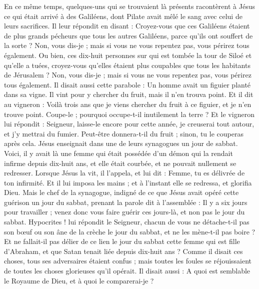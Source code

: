 \begin{multicols}{2}
{
\VerseOne{}En ce même temps, quelques-uns qui se trouvaient là présents racontèrent à Jésus ce qui était arrivé à des Galiléens, dont Pilate avait mêlé le sang avec celui de leurs sacrifices.
Il leur répondit en disant : Croyez-vous que ces Galiléens étaient de plus grands pécheurs que tous les autres Galiléens, parce qu'ils ont souffert de la sorte ?
Non, vous dis-je ; mais si vous ne vous repentez pas, vous périrez tous également.
Ou bien, ces dix-huit personnes sur qui est tombée la tour de Siloé et qu’elle a tuées, croyez-vous qu’elles étaient plus coupables que tous les habitants de Jérusalem ?
Non, vous dis-je ; mais si vous ne vous repentez pas, vous périrez tous également.
Il disait aussi cette parabole : Un homme avait un figuier planté dans sa vigne. Il vint pour y chercher du fruit, mais il n’en trouva point.
Et il dit au vigneron : Voilà trois ans que je viens chercher du fruit à ce figuier, et je n’en trouve point. Coupe-le ; pourquoi occupe-t-il inutilement la terre ?
Et le vigneron lui répondit : Seigneur, laisse-le encore pour cette année, je creuserai tout autour, et j’y mettrai du fumier.
Peut-être donnera-t-il du fruit ; sinon, tu le couperas après cela.
Jésus enseignait dans une de leurs synagogues un jour de sabbat.
Voici, il y avait là une femme qui était possédée d'un démon qui la rendait infirme depuis dix-huit ans, et elle était courbée, et ne pouvait nullement se redresser.
Lorsque Jésus la vit, il l'appela, et lui dit : Femme, tu es délivrée de ton infirmité.
Et il lui imposa les mains ; et à l’instant elle se redressa, et glorifia Dieu.
Mais le chef de la synagogue, indigné de ce que Jésus avait opéré cette guérison un jour du sabbat, prenant la parole dit à l'assemblée : Il y a six jours pour travailler ; venez donc vous faire guérir ces jours-là, et non pas le jour du sabbat.
Hypocrites ! lui répondit le Seigneur, chacun de vous ne détache-t-il pas son bœuf ou son âne de la crèche le jour du sabbat, et ne les mène-t-il pas boire ?
Et ne fallait-il pas délier de ce lien le jour du sabbat cette femme qui est fille d'Abraham, et que Satan tenait liée depuis dix-huit ans ?
Comme il disait ces choses, tous ses adversaires étaient confus ; mais toutes les foules se réjouissaient de toutes les choses glorieuses qu'il opérait.
\TextTitle{[grandeur]}
Il disait aussi : A quoi est semblable le Royaume de Dieu, et à quoi le comparerai-je ?
}
\end{multicols}
